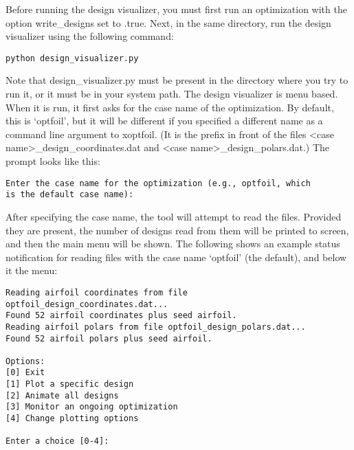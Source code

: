 \documentclass[11pt]{article}
\begin{document}
Before running the design visualizer, you must first run an optimization with the option
write\_designs set to .true. Next, in the same directory, run the design visualizer using
the following command:

\begin{verbatim}
python design_visualizer.py
\end{verbatim}

Note that design\_visualizer.py must be present in the directory where you try to run it,
or it must be in your system path.  The design visualizer is menu based.  When it is run, 
it first asks for the case name of the optimization.  By default, this is `optfoil', but
it will be different if you specified a different name as a command line argument to
xoptfoil. (It is the prefix in front of the files 
\textless case name\textgreater\_design\_coordinates.dat and
\textless case name\textgreater\_design\_polars.dat.)  The prompt looks like this:

\begin{verbatim}
Enter the case name for the optimization (e.g., optfoil, which 
is the default case name): 
\end{verbatim}

After specifying the case name, the tool will attempt to read the files.  Provided they
are present, the number of designs read from them will be printed to screen, and then the
main menu will be shown.  The following shows an example status notification for reading
files with the case name `optfoil' (the default), and below it the menu:

\begin{verbatim}
Reading airfoil coordinates from file optfoil_design_coordinates.dat...
Found 52 airfoil coordinates plus seed airfoil.
Reading airfoil polars from file optfoil_design_polars.dat...
Found 52 airfoil polars plus seed airfoil.

Options:
[0] Exit
[1] Plot a specific design
[2] Animate all designs
[3] Monitor an ongoing optimization
[4] Change plotting options

Enter a choice [0-4]: 
\end{verbatim}
\end{document}
